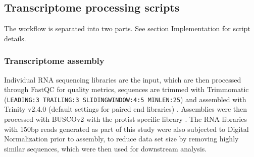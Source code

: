 \documentclass[fleqn,10pt,lineno]{wlpeerj} %
\begin{document}
\subsection*{Transcriptome processing scripts}
The workflow is separated into two parts. 
See section Implementation for script details.
\subsubsection*{Transcriptome assembly}
Individual RNA sequencing libraries are the input, which are then processed through FastQC \citep{fastqc} for quality metrics, sequences are trimmed with Trimmomatic (\texttt{LEADING:3 TRAILING:3 SLIDINGWINDOW:4:5 MINLEN:25}) \citep{bolger2014trimmomatic} and assembled with Trinity v2.4.0 (default settings for paired end libraries) \citep{haas2013novo}. 
Assemblies were then processed with BUSCOv2 with the protist specific library \citep{simao2015busco}. The RNA libraries with 150bp reads generated as part of this study were also subjected to Digital Normalization \citep{diginorm} prior to assembly, to reduce data set size by removing highly similar sequences, which were then used for downstream analysis.                                                                                                                                                                                                                                                                                                                                                                                                                                                                                                                                                                                                                                                                                                                                                                                                                                                                                                                                                                                                                                                                                                                                                                                                                                                                                                                                        
\end{document}

